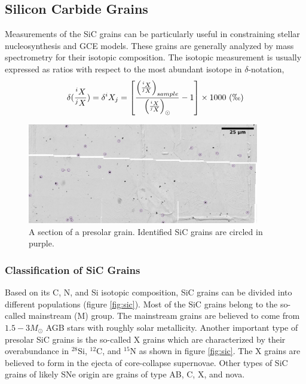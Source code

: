 \documentclass{brandeis-thesis3.2}
\def \msun {M_{\odot}}
\newcommand{\iso}[2]{$^{#1}${#2}}
\begin{document}
\subsection{Silicon Carbide Grains}
Measurements of the SiC grains can be particularly useful in constraining stellar nucleosynthesis and GCE models. These grains are generally analyzed by mass spectrometry for their isotopic composition. The isotopic measurement is usually expressed as ratios with respect to the most abundant isotope in $\delta$-notation,
\begin{equation}
\delta(\frac{^iX}{^jX}) = \delta^i X_j = \left[ \frac{\left( \frac{^iX}{^jX}\right)_{sample}}{\left(\frac{^iX}{^jX}\right)_{\odot}} - 1\right] \times 1000\ (\permil)
\end{equation}

\begin{figure}[htbp]
\centering
\includegraphics[width= 0.9\textwidth]{figs/sem_mount-s.jpg}
\caption{A section of a presolar grain. Identified SiC grains are circled in purple.}
\label{fig:sic_pic}
\end{figure}

\subsubsection{Classification of SiC Grains}
Based on its C, N, and Si isotopic composition, SiC grains can be divided into different populations (figure \ref{fig:sic}). Most of the SiC grains belong to the so-called mainstream (M) group. The mainstream grains are believed to come from $1.5-3\msun$ AGB stars with roughly solar metallicity. Another important type of presolar SiC grains is the so-called X grains which are characterized by their overabundance in \iso{28}{Si}, \iso{12}{C}, and \iso{15}{N} as shown in figure \ref{fig:sic}. The X grains are believed to form in the ejecta of core-collapse supernovae. Other types of SiC grains of likely SNe origin are grains of type AB, C, X, and nova. 
\end{document}
